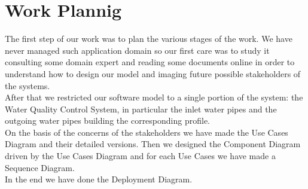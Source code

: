 \chapter{\textbf{Work Plannig}}
The first step of our work was to plan the various stages of the work. We have never managed such application domain so our first care was to study it consulting some domain expert and reading some documents online in order to understand how to design our model and imaging future possible stakeholders of the systems.
\\After that we restricted our software model to a single portion of the system: the Water Quality Control System, in particular the inlet water pipes and the outgoing water pipes building the corresponding profile.
\\On the basis of the concerns of the stakeholders we have made the Use Cases Diagram and their detailed versions. Then we designed the Component Diagram driven by the Use Cases Diagram and for each Use Cases we have made a Sequence Diagram.
\\In the end we have done the Deployment Diagram.
